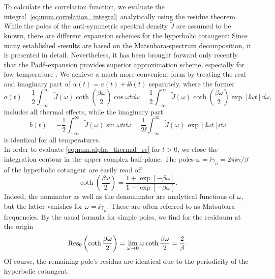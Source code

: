 To calculate the correlation function, we evaluate the integral~\ref{eq:num.correlation_integral} analytically using the residue theorem.
While the poles of the anti-symmetric spectral density $\tilde J$ are assumed to be known, there are different expansion schemes for the hyperbolic cotangent:
Since many established \HEOM-results are based on the Matsubara-spectrum decomposition, it is presented in detail.
Nevertheless, it has been brought forward only recently that the Padé-expansion provides superior approximation scheme, especially for low temperature \cite{HuXuYa10_pade,Hu11_pade}.
We achieve a much more convenient form by treating the real and imaginary part of $\alpha(t) = a(t) + \ii b(t)$ separately, where the former
\begin{equation}
  a(t) = \frac{1}{2} \int_{-\infty}^\infty \tilde J(\omega) \coth \left( \frac{\beta\omega}{2} \right) \cos \omega t \dd\omega
  = \frac{1}{2} \int_{-\infty}^\infty \tilde J(\omega) \coth \left( \frac{\beta\omega}{2} \right) \exp[\ii \omega t] \dd\omega,
  \label{eq:num.alpha_thermal_re}
\end{equation}
includes all thermal effects, while the imaginary part
\begin{equation*}
  b(t) = - \frac{1}{2} \int_{-\infty}^\infty \tilde J(\omega) \sin \omega t \dd \omega
  = \frac{1}{2\ii}\int_{-\infty}^\infty \tilde J(\omega) \, \exp[\ii\omega t] \dd\omega
\end{equation*}
is identical for all temperatures.\\




In order to evaluate \autoref{eq:num.alpha_thermal_re} for $t > 0$, we close the integration contour in the upper complex half-plane.
The poles $\omega = \ii\gamma_n = 2\pi \ii n / \beta$ of the hyperbolic cotangent are easily read off
\begin{equation}
  \coth \left( \frac{\beta \omega}{2} \right) = \frac{1 + \exp[-\beta\omega]}{1 - \exp[-\beta\omega]}.
  \label{eq:num.coth_representation}
\end{equation}
Indeed, the nominator as well as the denominator are analytical functions of $\omega$, but the latter vanishes for $\omega = \ii\gamma_n$.
These are often referred to as Matsubara frequencies.
By the usual formula for simple poles, we find for the residuum at the origin
\begin{equation*}
  \operatorname{Res}_{0} \left( \coth\frac{\beta\omega}{2} \right) = \lim_{\omega\to 0} \omega \coth \frac{\beta\omega}{2} = \frac{2}{\beta}.
\end{equation*}
Of course, the remaining pole's residua are identical due to the periodicity of the hyperbolic cotangent.

